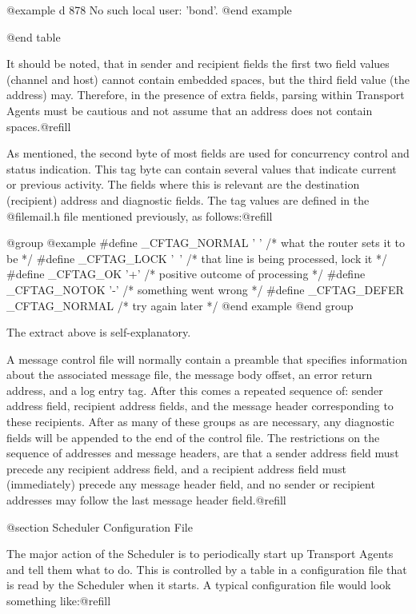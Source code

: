 {{@example
d 878 No such local user: 'bond'.
@end example

@end table

It should be noted, that in sender and recipient fields the first two
field values (channel and host) cannot contain embedded spaces, but the
third field value (the address) may.  Therefore, in the presence of extra
fields, parsing within Transport Agents must be cautious and
not assume that an address does not contain spaces.@refill

As mentioned, the second byte of most fields are used for concurrency control
and status indication.  This tag byte can contain several values that
indicate current or previous activity.  The fields where this is relevant are
the destination (recipient) address and diagnostic fields.  The tag values
are defined in the @file{mail.h} file mentioned previously, as
follows:@refill

@group
@example
#define _CFTAG_NORMAL ' ' /* what the router sets it to be */
#define _CFTAG_LOCK   '~' /* that line is being processed, lock it */
#define _CFTAG_OK     '+' /* positive outcome of processing */
#define _CFTAG_NOTOK  '-' /* something went wrong */
#define _CFTAG_DEFER  _CFTAG_NORMAL /* try again later */
@end example
@end group

The extract above is self-explanatory.

A message control file will normally contain a preamble that specifies
information about the associated message file, the message body offset, an
error return address, and a log entry tag.  After this comes a repeated
sequence of: sender address field, recipient address fields, and the message
header corresponding to these recipients.  After as many of these groups as
are necessary, any diagnostic fields will be appended to the end of the
control file.  The restrictions on the sequence of addresses and message
headers, are that a sender address field must precede any recipient address
field, and a recipient address field must (immediately) precede any message
header field, and no sender or recipient addresses may follow the last
message header field.@refill

@section Scheduler Configuration File

The major action of the Scheduler is to periodically start up Transport
Agents and tell them what to do.  This is controlled by a table in a
configuration file that is read by the Scheduler when it starts.  A typical
configuration file would look something like:@refill

}}

